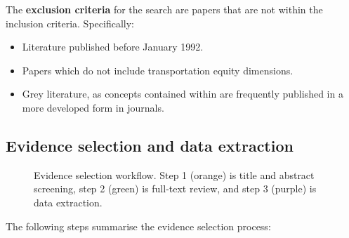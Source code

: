 \documentclass[
  letterpaper,
  DIV=11,
  numbers=noendperiod]{scrartcl}
\providecommand{\tightlist}{%
  \setlength{\itemsep}{0pt}\setlength{\parskip}{0pt}}\usepackage{longtable,booktabs,array}
\begin{document}
The \textbf{exclusion criteria} for the search are papers that are not
within the inclusion criteria. Specifically:

\begin{itemize}
\tightlist
\item
  Literature published before January 1992.
\item
  Papers which do not include transportation equity dimensions.
\item
  Grey literature, as concepts contained within are frequently published
  in a more developed form in journals.
\end{itemize}

\subsection{Evidence selection and data extraction}\label{sec-sect62}

\begin{figure}


\caption{\label{fig-figA3}Evidence selection workflow. Step 1 (orange)
is title and abstract screening, step 2 (green) is full-text review, and
step 3 (purple) is data extraction.}

\end{figure}%

The following steps summarise the evidence selection process:
\end{document}
